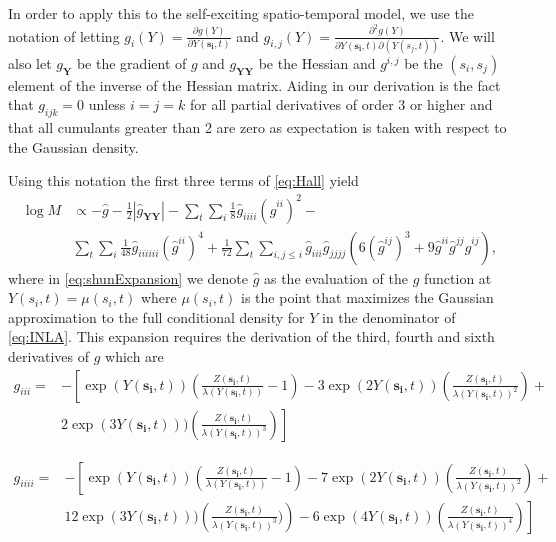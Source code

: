 \documentclass[11pt]{isuthesis}
\begin{document}
	In order to apply this to the self-exciting spatio-temporal model, we use the notation of \cite{evangelou2011estimation} letting $g_i(Y)= \frac{\partial g(Y)}{\partial Y(\boldsymbol{s_i},t)}$ and $g_{i,j}(Y)=\frac{\partial^2 g(Y)}{\partial Y(\boldsymbol{s_i},t) \partial(Y(s_j,t))}$.  We will also let $g_{\boldsymbol{Y}}$ be the gradient of $g$ and $g_{\boldsymbol{YY}}$ be the Hessian and $g^{i,j}$ be the $(s_i,s_j)$ element of the inverse of the Hessian matrix.  Aiding in our derivation is the fact that $g_{ijk}=0$ unless $i=j=k$ for all partial derivatives of order 3 or higher and that all cumulants greater than 2 are zero as expectation is taken with respect to the Gaussian density.
	
	Using this notation the first three terms of \eqref{eq:Hall} yield
	 \begin{align}
	 \log M & \propto -\hat{g}-\frac{1}{2}|\hat{g}_{\boldsymbol{YY}}|-\sum_{t}\sum_{i}\frac{1}{8}\hat{g}_{iiii}(\hat{g}^{ii})^2- \nonumber\\
	 &\sum_{t}\sum_{i}\frac{1}{48}\hat{g}_{iiiiii}(\hat{g}^{ii})^4 +
	 \frac{1}{72}\sum_{t}\sum_{i,j\leq i}\hat{g}_{iii}\hat{g}_{jjjj}\left(6 \left(\hat{g}^{ij}\right)^3+9 \hat{g}^{ii}\hat{g}^{jj}\hat{g}^{ij}\right) \label{eq:shunExpansion},
	 \end{align}
	 where in \eqref{eq:shunExpansion} we denote $\hat{g}$ as the evaluation of the $g$ function at $Y(s_i,t)=\mu(s_i,t)$ where $\mu(s_i,t)$ is the point that maximizes the Gaussian approximation to the full conditional density for $Y$ in the denominator of \eqref{eq:INLA}. This expansion requires the derivation of the third, fourth and sixth derivatives of $g$ which are
	\begin{align}
	g_{iii}=  &-\left[\exp(Y(\boldsymbol{s_i},t))\left(\frac{Z(\boldsymbol{s_i},t)}{\lambda(Y(\boldsymbol{s_i},t))}-1\right)-3\exp(2 Y(\boldsymbol{s_i},t))\left(\frac{ Z(\boldsymbol{s_i},t)}{\lambda(Y(\boldsymbol{s_i},t))^2}\right)+\right.\nonumber\\
	& \left. 2\exp(3Y(\boldsymbol{s_i},t)))\left(\frac{ Z(\boldsymbol{s_i},t)}{\lambda(Y(\boldsymbol{s_i},t))^3}\right)\right] \label{eq:thirds}
	\end{align}
	
	\begin{align}
	g_{iiii}=  &-\left[\exp(Y(\boldsymbol{s_i},t))\left(\frac{ Z(\boldsymbol{s_i},t)}{\lambda(Y(\boldsymbol{s_i},t))}-1\right)-7\exp(2 Y(\boldsymbol{s_i},t))\left(\frac{Z(\boldsymbol{s_i},t)}{\lambda(Y(\boldsymbol{s_i},t))^2}\right)+\right.\nonumber\\
	& \left. 12\exp(3Y(\boldsymbol{s_i},t)))\left(\frac{ Z(\boldsymbol{s_i},t)}{\lambda(Y(\boldsymbol{s_i},t))^3})\right)-6\exp(4Y(\boldsymbol{s_i},t))\left(\frac{ Z(\boldsymbol{s_i},t)}{\lambda(Y(\boldsymbol{s_i},t))^4}\right)\right] \label{eq:fourths}
	\end{align}
	
\end{document}

